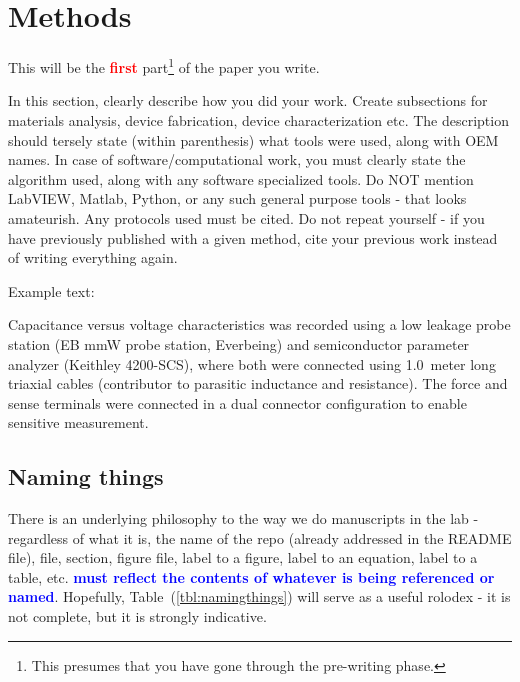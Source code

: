 \documentclass[12pt,twocolumn]{article}
\begin{document}
\section{Methods}
This will be the \textbf{\Huge \textcolor{red}{first}} part\footnote{This presumes that you have gone through the pre-writing phase.} of the paper you write.

In this section, clearly describe how you did your work. Create subsections for materials analysis, device fabrication, device characterization etc. The description should tersely state (within parenthesis) what tools were used, along with OEM names. In case of software/computational work, you must clearly state the algorithm used, along with any software specialized tools. Do NOT mention LabVIEW, Matlab, Python, or any such general purpose tools - that looks amateurish. Any protocols used must be cited. Do not repeat yourself - if you have previously published with a given method, cite your previous work instead of writing everything again.

Example text:

Capacitance versus voltage characteristics was recorded using a low leakage probe station (EB mmW probe station, Everbeing) and semiconductor parameter analyzer (Keithley 4200-SCS), where both were connected using \SI{1.0}{meter} long triaxial cables (contributor to parasitic inductance and resistance). The force and sense terminals were connected in a dual connector configuration to enable sensitive measurement.

\subsection{Naming things}

There is an underlying philosophy to the way we do manuscripts in the lab - regardless of what it is, the name of the repo (already addressed in the README file), file, section, figure file, label to a figure, label to an equation, label to a table, etc. \textbf{\Huge \textcolor{blue}{must reflect the contents of whatever is being referenced or named}}. Hopefully, Table~(\ref{tbl:namingthings}) will serve as a useful rolodex - it is not complete, but it is strongly indicative.
\end{document}
